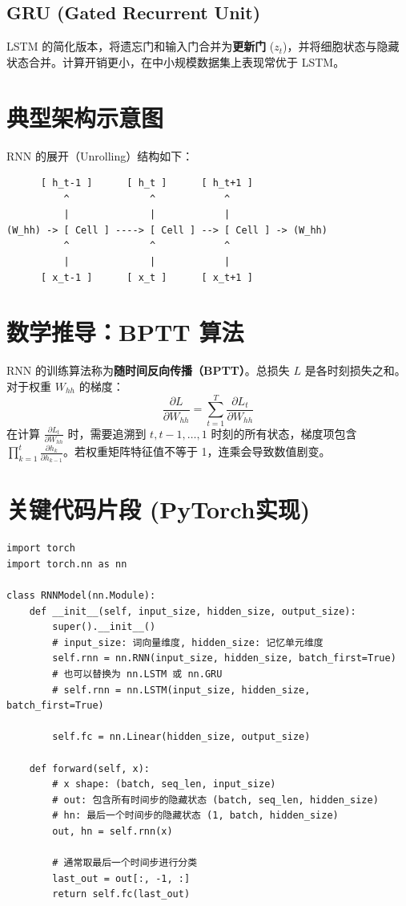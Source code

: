 \documentclass[12pt, a4paper]{article}
\begin{document}
\subsection{GRU (Gated Recurrent Unit)}
LSTM 的简化版本，将遗忘门和输入门合并为\textbf{更新门} ($z_t$)，并将细胞状态与隐藏状态合并。计算开销更小，在中小规模数据集上表现常优于 LSTM。

\section{典型架构示意图}
RNN 的展开（Unrolling）结构如下：
\begin{verbatim}
      [ h_t-1 ]      [ h_t ]      [ h_t+1 ]
          ^              ^            ^
          |              |            |
(W_hh) -> [ Cell ] ----> [ Cell ] --> [ Cell ] -> (W_hh)
          ^              ^            ^
          |              |            |
      [ x_t-1 ]      [ x_t ]      [ x_t+1 ]
\end{verbatim}

\section{数学推导：BPTT 算法}
RNN 的训练算法称为\textbf{随时间反向传播（BPTT）}。总损失 $L$ 是各时刻损失之和。对于权重 $W_{hh}$ 的梯度：
$$ \frac{\partial L}{\partial W_{hh}} = \sum_{t=1}^T \frac{\partial L_t}{\partial W_{hh}} $$
在计算 $\frac{\partial L_t}{\partial W_{hh}}$ 时，需要追溯到 $t, t-1, \dots, 1$ 时刻的所有状态，梯度项包含 $\prod_{k=1}^t \frac{\partial h_k}{\partial h_{k-1}}$。若权重矩阵特征值不等于 1，连乘会导致数值剧变。

\section{关键代码片段 (PyTorch实现)}
\begin{lstlisting}
import torch
import torch.nn as nn

class RNNModel(nn.Module):
    def __init__(self, input_size, hidden_size, output_size):
        super().__init__()
        # input_size: 词向量维度, hidden_size: 记忆单元维度
        self.rnn = nn.RNN(input_size, hidden_size, batch_first=True)
        # 也可以替换为 nn.LSTM 或 nn.GRU
        # self.rnn = nn.LSTM(input_size, hidden_size, batch_first=True)
        
        self.fc = nn.Linear(hidden_size, output_size)

    def forward(self, x):
        # x shape: (batch, seq_len, input_size)
        # out: 包含所有时间步的隐藏状态 (batch, seq_len, hidden_size)
        # hn: 最后一个时间步的隐藏状态 (1, batch, hidden_size)
        out, hn = self.rnn(x)
        
        # 通常取最后一个时间步进行分类
        last_out = out[:, -1, :]
        return self.fc(last_out)
\end{lstlisting}
\end{document}
